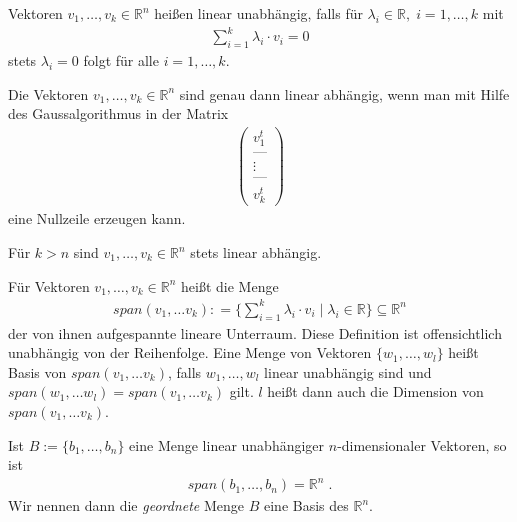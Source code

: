 \begin{Definition}
Vektoren $v_1, \hdots ,v_k \in \mathbb{R}^n$ heißen linear unabhängig, falls für $\lambda_i \in \mathbb{R}, \; i=1, \hdots ,k $ mit
\begin{align*}
\sum_{i= 1}^k \lambda_i \cdot v_i = 0
\end{align*} 
stets $\lambda_i = 0$ folgt für alle $i = 1, \hdots, k$. 
\end{Definition}

\begin{Satz}
Die Vektoren $v_1, \hdots ,v_k \in \mathbb{R}^n$ sind genau dann linear abhängig, wenn man 
mit Hilfe des Gaussalgorithmus in der Matrix 
\begin{align*}
\begin{pmatrix}
v_1^t \\   \text{---} \\ \vdots \\  \text{---} \\ v_k^t
\end{pmatrix}
\end{align*}
eine Nullzeile erzeugen kann.
\end{Satz}

\begin{Bemerkung}
Für $k>n$ sind $v_1, \hdots ,v_k \in \mathbb{R}^n$ stets linear abhängig.
\end{Bemerkung}

\begin{Definition}
Für Vektoren $v_1, \hdots , v_k \in \mathbb{R}^n$ heißt die Menge
\begin{align*}
span(v_1, \hdots v_k) : = \biggl\{ \sum_{i=1}^k \lambda_i \cdot v_i \; | \; \lambda_i \in \mathbb{R}  \biggr\} \subseteq \mathbb{R}^n
\end{align*}
der von ihnen aufgespannte lineare Unterraum. Diese Definition ist offensichtlich unabhängig von der Reihenfolge. 
Eine Menge von Vektoren $\{ w_1, \hdots , w_l \}$ heißt Basis von
$span(v_1, \hdots v_k)$, falls $w_1, \hdots , w_l$ linear unabhängig sind und
$span(w_1, \hdots w_l) = span(v_1, \hdots v_k)$ gilt. $l$ heißt dann auch die Dimension von $span(v_1, \hdots v_k)$. 
\end{Definition}


\begin{Satz}
Ist $B:= \{ b_1, \hdots , b_n \}$ eine Menge linear unabhängiger $n$-dimensionaler Vektoren, so ist
\begin{align*}
span(b_1, \hdots ,b_n) = \mathbb{R}^n \; .
\end{align*}
Wir nennen dann die \emph{geordnete} Menge $B$ eine Basis des $\mathbb{R}^n$. 
\end{Satz}


